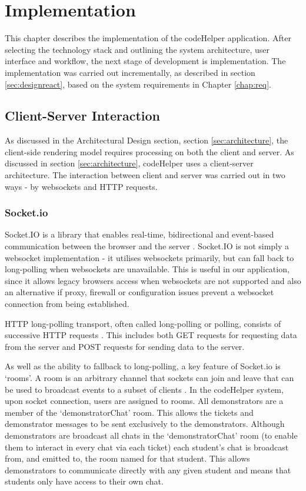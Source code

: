 \chapter{Implementation}

This chapter describes the implementation of the codeHelper application. After selecting the technology stack and outlining the system architecture, user interface and workflow, the next stage of development is implementation. The implementation was carried out incrementally, as described in section \ref{sec:designreact}, based on the system requirements in Chapter \ref{chap:req}. 

\section{Client-Server Interaction}

As discussed in the Architectural Design section, section \ref{sec:architecture}, the client-side rendering model requires processing on both the client and server. As discussed in section \ref{sec:architecture}, codeHelper uses a client-server architecture. The interaction between client and server was carried out in two ways - by websockets and HTTP requests.

\subsection{Socket.io}

Socket.IO is a library that enables real-time, bidirectional and event-based communication between the browser and the server \cite{socketio}. Socket.IO is not simply a websocket implementation - it utilises websockets primarily, but can fall back to long-polling when websockets are unavailable. This is useful in our application, since it allows legacy browsers access when websockets are not supported and also an alternative if proxy, firewall or configuration issues prevent a websocket connection from being established.

HTTP long-polling transport, often called long-polling or polling, consists of successive HTTP requests \cite{socketio}. This includes both GET requests for requesting data from the server and POST requests for sending data to the server.

As well as the ability to fallback to long-polling, a key feature of Socket.io is `rooms'. A room is an arbitrary channel that sockets can join and leave that can be used to broadcast events to a subset of clients \cite{socketio}. In the codeHelper system, upon socket connection, users are assigned to rooms. All demonstrators are a member of the `demonstratorChat' room. This allows the tickets and demonstrator messages to be sent exclusively to the demonstrators. Although demonstrators are broadcast all chats in the `demonstratorChat' room (to enable them to interact in every chat via each ticket) each student's chat is broadcast from, and emitted to, the room named for that student. This allows demonstrators to communicate directly with any given student and means that students only have access to their own chat. 

